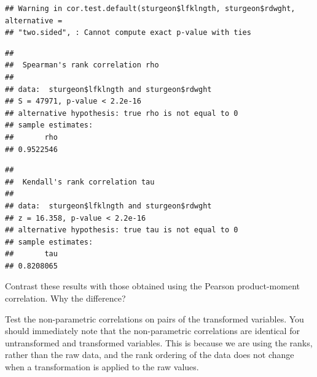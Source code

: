 \documentclass[
  12pt,
]{book}
\newenvironment{Shaded}{\begin{snugshade}}{\end{snugshade}}
\newcommand{\DataTypeTok}[1]{\textcolor[rgb]{0.13,0.29,0.53}{#1}}
\newcommand{\KeywordTok}[1]{\textcolor[rgb]{0.13,0.29,0.53}{\textbf{#1}}}
\newcommand{\NormalTok}[1]{#1}
\newcommand{\OperatorTok}[1]{\textcolor[rgb]{0.81,0.36,0.00}{\textbf{#1}}}
\newcommand{\StringTok}[1]{\textcolor[rgb]{0.31,0.60,0.02}{#1}}
\begin{document}
\begin{Shaded}
\end{Shaded}

\begin{verbatim}
## Warning in cor.test.default(sturgeon$lfklngth, sturgeon$rdwght, alternative =
## "two.sided", : Cannot compute exact p-value with ties
\end{verbatim}

\begin{verbatim}
## 
##  Spearman's rank correlation rho
## 
## data:  sturgeon$lfklngth and sturgeon$rdwght
## S = 47971, p-value < 2.2e-16
## alternative hypothesis: true rho is not equal to 0
## sample estimates:
##       rho 
## 0.9522546
\end{verbatim}

\begin{Shaded}
\end{Shaded}

\begin{verbatim}
## 
##  Kendall's rank correlation tau
## 
## data:  sturgeon$lfklngth and sturgeon$rdwght
## z = 16.358, p-value < 2.2e-16
## alternative hypothesis: true tau is not equal to 0
## sample estimates:
##       tau 
## 0.8208065
\end{verbatim}

Contrast these results with those obtained using the Pearson product-moment correlation. Why the difference?

Test the non-parametric correlations on pairs of the transformed variables. You should immediately note that the non-parametric correlations are identical for untransformed and transformed variables. This is because we are using the ranks, rather than the raw data, and the rank ordering of the data does not change when a transformation is applied to the raw values.
\end{document}
